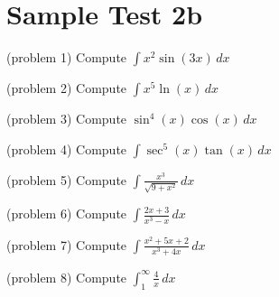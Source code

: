 \documentclass{ximera}
\begin{document}
\section{Sample Test 2b}





\begin{problem}(problem 1)
Compute $\displaystyle \int x^2\sin(3x) \, dx$

\end{problem}


\begin{problem}(problem 2)
Compute $\displaystyle \int x^5 \ln(x) \, dx$

\end{problem}

\begin{problem}(problem 3)
Compute $\displaystyle \sin^4(x) \cos(x) \, dx$

\end{problem}

\begin{problem}(problem 4)
Compute $\displaystyle \int \sec^5(x) \tan(x)  \, dx$

\end{problem}

\begin{problem}(problem 5)
Compute $\displaystyle \int \frac{x^3}{ \sqrt{9+x^2}} \, dx$

\end{problem}

\begin{problem}(problem 6)
Compute $\displaystyle \int \frac{2x+3}{x^3-x} \, dx$

\end{problem}

\begin{problem}(problem 7)
Compute $\displaystyle \int \frac{x^2 + 5x + 2}{x^3 + 4x} \, dx$

\end{problem}

\begin{problem}(problem 8)
Compute $\displaystyle \int_1^\infty \frac{4}{x} \, dx$

\end{problem}
\end{document}
